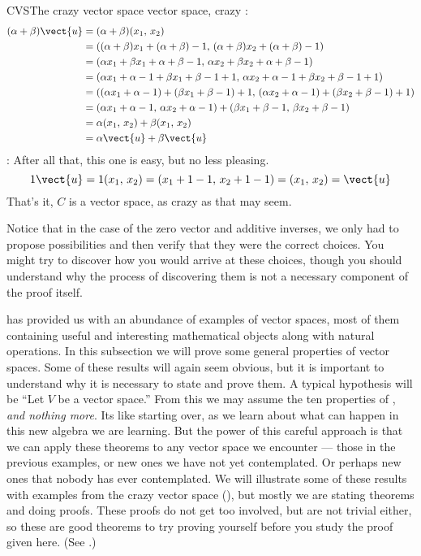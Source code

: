 \begin{example}{CVS}{The crazy vector space }{vector space, crazy}
%
:
%
\begin{align*}
(\alpha+\beta)\vect{u}&=(\alpha+\beta)(x_1,\,x_2)\\
&=((\alpha+\beta)x_1+(\alpha+\beta)-1,\,(\alpha+\beta)x_2+(\alpha+\beta)-1)\\
&=(\alpha x_1+\beta x_1+\alpha+\beta-1,\,\alpha x_2+\beta x_2+\alpha+\beta-1)\\
&=(\alpha x_1+\alpha-1+\beta x_1+\beta-1+1,\,\alpha x_2+\alpha-1+\beta x_2+\beta-1+1)\\
&=((\alpha x_1+\alpha-1)+(\beta x_1+\beta-1)+1,\,(\alpha x_2+\alpha-1)+(\beta x_2+\beta-1)+1)\\
&=(\alpha x_1+\alpha-1,\,\alpha x_2+\alpha-1)+(\beta x_1+\beta-1,\,\beta x_2+\beta-1)\\
&=\alpha(x_1,\,x_2)+\beta(x_1,\,x_2)\\
&=\alpha\vect{u}+\beta\vect{u}
\end{align*}
%
:  After all that, this one is easy, but no less pleasing.
%
\begin{equation*}
1\vect{u}=1(x_1,\,x_2)=(x_1+1-1,\,x_2+1-1)=(x_1,\,x_2)=\vect{u}
\end{equation*}
%
That's it, $C$ is a vector space, as crazy as that may seem.\par
%
Notice that in the case of the zero vector and additive inverses, we only had to propose possibilities and then verify that they were the correct choices.  You might try to discover how you would arrive at these choices, though you should understand why the process of discovering them is not a necessary component of the proof itself.
\end{example}
%
%
 has provided us with an abundance of examples of vector spaces, most of them containing useful and interesting mathematical objects along with natural operations.  In this subsection we will prove some general properties of vector spaces.  Some of these results will again seem obvious, but it is important to understand why it is necessary to state and prove them.  A typical hypothesis will be ``Let $V$ be a vector space.''  From this we may assume the ten properties of , {\em and nothing more}.  Its like starting over, as we learn about what can happen in this new algebra we are learning.  But the power of this careful approach is that we can apply these theorems to any vector space we encounter --- those in the previous examples, or new ones we have not yet contemplated.  Or perhaps new ones that nobody has ever contemplated.  We will illustrate some of these results with examples from the crazy vector space (), but mostly we are stating theorems and doing proofs.  These proofs do not get too involved, but are not trivial either, so these are good theorems to try proving yourself before you study the proof given here.  (See .)\par
